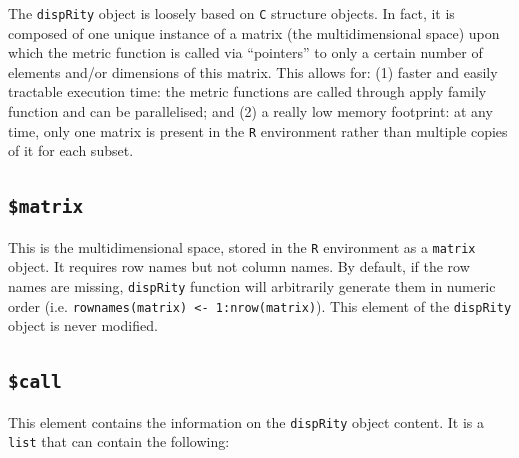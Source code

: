 \documentclass[]{book}
\theoremstyle{definition}
\theoremstyle{definition}
\theoremstyle{remark}
\begin{document}
The \texttt{dispRity} object is loosely based on \texttt{C} structure
objects. In fact, it is composed of one unique instance of a matrix (the
multidimensional space) upon which the metric function is called via
``pointers'' to only a certain number of elements and/or dimensions of
this matrix. This allows for: (1) faster and easily tractable execution
time: the metric functions are called through apply family function and
can be parallelised; and (2) a really low memory footprint: at any time,
only one matrix is present in the \texttt{R} environment rather than
multiple copies of it for each subset.

\subsection{\texorpdfstring{\texttt{\$matrix}}{\$matrix}}\label{matrix}

This is the multidimensional space, stored in the \texttt{R} environment
as a \texttt{matrix} object. It requires row names but not column names.
By default, if the row names are missing, \texttt{dispRity} function
will arbitrarily generate them in numeric order (i.e.
\texttt{rownames(matrix)\ \textless{}-\ 1:nrow(matrix)}). This element
of the \texttt{dispRity} object is never modified.

\subsection{\texorpdfstring{\texttt{\$call}}{\$call}}\label{call}

This element contains the information on the \texttt{dispRity} object
content. It is a \texttt{list} that can contain the following:
\end{document}

